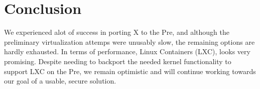 \section{Conclusion}
\label{sec:conclusion}
We experienced alot of success in porting X to the Pre, and although the preliminary virtualization attemps were unusably slow, the remaining options are hardly exhausted.  In terms of performance, Linux Containers (LXC), looks very promising.  Despite needing to backport the needed kernel functionality to support LXC on the Pre, we remain optimistic and will continue working towards our goal of a usable, secure solution.
